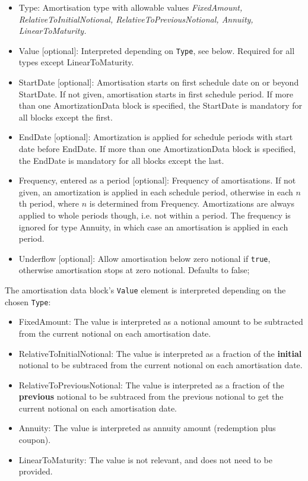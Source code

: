 \begin{itemize}
\item Type: Amortisation type with allowable values {\em FixedAmount, RelativeToInitialNotional,
  RelativeToPreviousNotional, Annuity, LinearToMaturity.}
\item Value [optional]: Interpreted depending on {\tt Type}, see below. Required for all types except LinearToMaturity.
\item StartDate [optional]: Amortisation starts on first schedule date on or beyond StartDate. If not given,
  amortisation starts in first schedule period. If more than one AmortizationData block is specified, the StartDate is
  mandatory for all blocks except the first.
\item EndDate [optional]: Amortization is applied for schedule periods with start date before EndDate. If more than one
  AmortizationData block is specified, the EndDate is mandatory for all blocks except the last.
\item Frequency, entered as a period [optional]: Frequency of amortisations. If not given, an amortization is applied in
  each schedule period, otherwise in each $n$th period, where $n$ is determined from Frequency. Amortizations are always
  applied to whole periods though, i.e. not within a period. The frequency is ignored for type Annuity, in which case an
  amortisation is applied in each period.
\item Underflow [optional]: Allow amortisation below zero notional if {\tt true}, otherwise amortisation stops at zero
  notional. Defaults to false;
\end{itemize}

The amortisation data block's {\tt Value} element  is interpreted
depending on the chosen {\tt Type}:
\begin{itemize}
\item FixedAmount: The value is interpreted as a notional amount to be
  subtracted from the current notional on each amortisation date.
\item RelativeToInitialNotional: The value is interpreted as a
  fraction of the {\bf initial} notional to be subtraced from the current
  notional on each amortisation date.
\item RelativeToPreviousNotional: The value is interpreted as a
  fraction of the {\bf previous} notional to be subtraced from the previous
  notional to get the current notional on each amortisation date.
\item Annuity: The value is interpreted as annuity amount (redemption
  plus coupon).
\item LinearToMaturity: The value is not relevant, and does not need to be provided.
\end{itemize}


